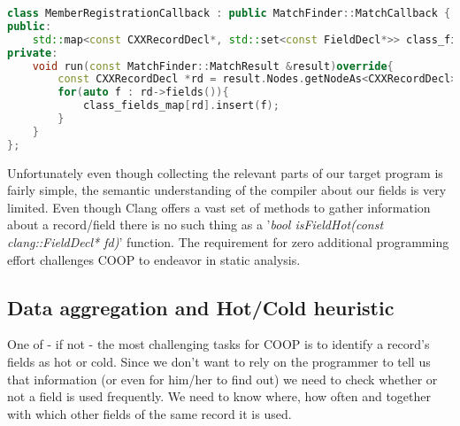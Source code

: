 \begin{lstlisting}[language=C++,name={Callback definition to register the records' members}, label={member_registration_callback}]
class MemberRegistrationCallback : public MatchFinder::MatchCallback {
public:
	std::map<const CXXRecordDecl*, std::set<const FieldDecl*>> class_fields_map;
private:
	void run(const MatchFinder::MatchResult &result)override{
		const CXXRecordDecl *rd = result.Nodes.getNodeAs<CXXRecordDecl>("record_binding");
		for(auto f : rd->fields()){		
			class_fields_map[rd].insert(f);
		}
	}
};
\end{lstlisting}
Unfortunately even though collecting the relevant parts of our target program is fairly simple, the semantic understanding of the compiler about our fields is very limited. Even though Clang offers a vast set of methods to gather information about a record/field there is no such thing as a '\textit{bool isFieldHot(const clang::FieldDecl* fd)}' function. The requirement for zero additional programming effort challenges COOP to endeavor in static analysis.

\subsection{Data aggregation and Hot/Cold heuristic}\label{data_aggregation}
One of - if not - the most challenging tasks for COOP is to identify a record's fields as hot or cold. Since we don't want to rely on the programmer to tell us that information (or even for him/her to find out) we need to check whether or not a field is used frequently. We need to know where, how often and together with which other fields of the same record it is used. 